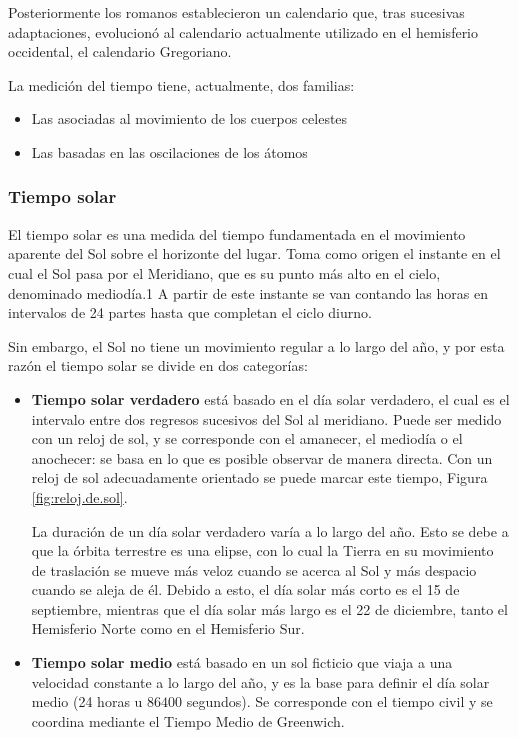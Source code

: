 \documentclass[a4paper,12pt,twoside]{article}
\begin{document}
Posteriormente los romanos establecieron un calendario que, tras sucesivas adaptaciones, evolucion\'o al calendario actualmente utilizado en el hemisferio occidental, el calendario Gregoriano.

La medici\'on del tiempo tiene, actualmente, dos familias:
\begin{itemize}
\item Las asociadas al movimiento de los cuerpos celestes
\item Las basadas en las oscilaciones de los \'atomos
\end{itemize}

\subsubsection{Tiempo solar}
\label{sec:tiempo.solar}

El tiempo solar es una medida del tiempo fundamentada en el movimiento aparente del Sol sobre el horizonte del lugar. Toma como origen el instante en el cual el Sol pasa por el Meridiano, que es su punto más alto en el cielo, denominado mediodía.1 A partir de este instante se van contando las horas en intervalos de 24 partes hasta que completan el ciclo diurno.

Sin embargo, el Sol no tiene un movimiento regular a lo largo del año, y por esta razón el tiempo solar se divide en dos categorías:

\begin{itemize}
\item {\bf Tiempo solar verdadero} está basado en el día solar verdadero,
  el cual es el intervalo entre dos regresos sucesivos del Sol al
  meridiano. Puede ser medido con un reloj de sol, y se corresponde
  con el amanecer, el mediodía o el anochecer: se basa en lo que es
  posible observar de manera directa. Con un reloj de sol adecuadamente orientado se puede marcar este tiempo, Figura \ref{fig:reloj.de.sol}.

La duración de un día solar verdadero varía a lo largo del año. Esto se debe a que la órbita terrestre es una elipse, con lo cual la Tierra en su movimiento de traslación se mueve más veloz cuando se acerca al Sol y más despacio cuando se aleja de él. Debido a esto, el día solar más corto es el 15 de septiembre, mientras que el día solar más largo es el 22 de diciembre, tanto el Hemisferio Norte como en el Hemisferio Sur.


\item \textbf{ Tiempo solar medio} está basado en un sol ficticio que viaja a una   velocidad constante a lo largo del año, y es la base para definir el
  día solar medio (24 horas u $86400$ segundos). Se corresponde con el
  tiempo civil y se coordina mediante el Tiempo Medio de Greenwich.
\end{itemize}
\end{document}
